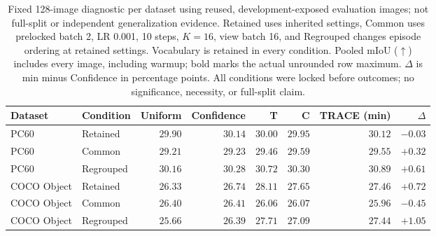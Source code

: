 \begin{table}[t]
\caption{Fixed 128-image diagnostic per dataset using reused, development-exposed evaluation images; not full-split or independent generalization evidence. Retained uses inherited settings, Common uses prelocked batch 2, LR 0.001, 10 steps, $K=16$, view batch 16, and Regrouped changes episode ordering at retained settings. Vocabulary is retained in every condition. Pooled mIoU ($\uparrow$) includes every image, including warmup; bold marks the actual unrounded row maximum. $\Delta$ is min minus Confidence in percentage points. All conditions were locked before outcomes; no significance, necessity, or full-split claim.}
\label{tab:standalone-comparison}
\centering\small
\begin{tabular}{@{}llrrrrrr@{}}
\toprule
Dataset & Condition & Uniform & Confidence & T & C & TRACE (min) & $\Delta$ \\
\midrule
PC60 & Retained & $29.90$ & $\mathbf{30.14}$ & $30.00$ & $29.95$ & $30.12$ & $-0.03$ \\
PC60 & Common & $29.21$ & $29.23$ & $29.46$ & $\mathbf{29.59}$ & $29.55$ & $+0.32$ \\
PC60 & Regrouped & $30.16$ & $30.28$ & $30.72$ & $30.30$ & $\mathbf{30.89}$ & $+0.61$ \\
COCO Object & Retained & $26.33$ & $26.74$ & $\mathbf{28.11}$ & $27.65$ & $27.46$ & $+0.72$ \\
COCO Object & Common & $26.40$ & $\mathbf{26.41}$ & $26.06$ & $26.07$ & $25.96$ & $-0.45$ \\
COCO Object & Regrouped & $25.66$ & $26.39$ & $\mathbf{27.71}$ & $27.09$ & $27.44$ & $+1.05$ \\
\bottomrule
\end{tabular}
\end{table}
